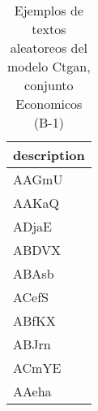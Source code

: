 \begin{table}[H]
\centering
\fontsize{8}{14}\selectfont
\caption{Ejemplos de textos aleatoreos del modelo Ctgan, conjunto Economicos (B-1)}
\label{table-sample10-economicos-b-1-ctgan-text}
\begin{tabular}{|m{50em}|}
\hline
\rowcolor[gray]{0.8}
description \\
\hline AAGmU \\
\hline AAKaQ \\
\hline ADjaE \\
\hline ABDVX \\
\hline ABAsb \\
\hline ACefS \\
\hline ABfKX \\
\hline ABJrn \\
\hline ACmYE \\
\hline AAeha \\
\hline
\end{tabular}
\end{table}
